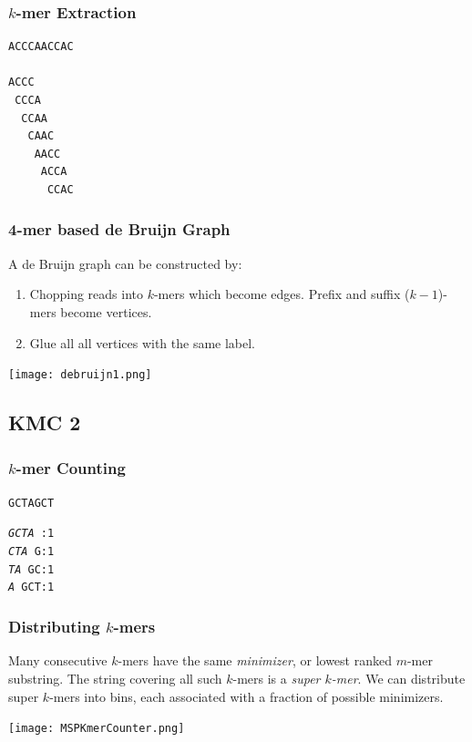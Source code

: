 \documentclass{beamer}
\begin{document}
\begin{frame}[fragile]
\frametitle{$k$-mer Extraction}
\begin{verbatim}
ACCCAACCAC

ACCC
 CCCA
  CCAA
   CAAC
    AACC
     ACCA
      CCAC

\end{verbatim}
\end{frame}

\begin{frame}
\frametitle{4-mer based de Bruijn Graph}
A de Bruijn graph can be constructed by:
\begin{enumerate}
\item Chopping reads into $k$-mers which become edges. Prefix and suffix ($k-1$)-mers become vertices.
\item Glue all all vertices with the same label.
\end{enumerate}

\texttt{[image: debruijn1.png]}



\end{frame}



\subsection{KMC 2}

\begin{frame}
\frametitle{$k$-mer Counting}

\begin{alltt}
GCTAGCT

\end{alltt}

\begin{alltt}
\emph{GCTA}~ : 1 \\
\emph{CTA}~G : 1 \\
\emph{TA}~GC : 1 \\
\emph{A}~GCT : 1 \\
\end{alltt}

% 
\end{frame}



\begin{frame}
\frametitle{Distributing $k$-mers}
Many consecutive $k$-mers have the same \emph{minimizer}, or lowest ranked $m$-mer substring.  The string covering all such $k$-mers is a \emph{super $k$-mer}. We can distribute super $k$-mers into bins, each associated with a fraction of possible minimizers.


\texttt{[image: MSPKmerCounter.png]}

\end{frame}
\end{document}
